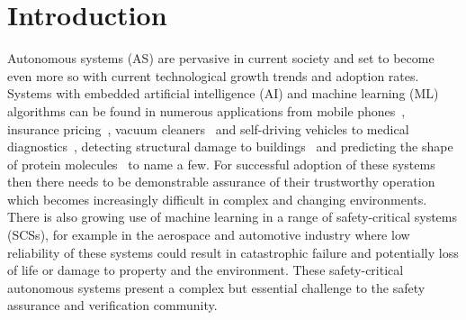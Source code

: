 % 


\section{Introduction}\label{sec:intro}

Autonomous systems (AS) are pervasive in current society and set to become even more so with current technological growth trends and adoption rates. Systems with embedded artificial intelligence (AI) and machine learning (ML) algorithms can be found in numerous applications from mobile phones~\cite{mediumaiphones}, insurance pricing~\cite{kuo2020towards}, vacuum cleaners~\cite{tf_vacuum} and self-driving vehicles to medical diagnostics~\cite{kononenko2001machine}, detecting structural damage to buildings~\cite{avci2021review} and predicting the shape of protein molecules~\cite{alpha_fold} to name a few.
%
For successful adoption of these systems then there needs to be demonstrable assurance of their trustworthy operation which becomes increasingly difficult in complex and changing environments.  
%
There is also growing use of machine learning in a range of safety-critical systems (SCSs), for example in the aerospace and automotive industry where low reliability of these systems could result in catastrophic failure and potentially loss of life or damage to property and the environment. These safety-critical autonomous systems present a complex but essential challenge to the safety assurance and verification community. 

